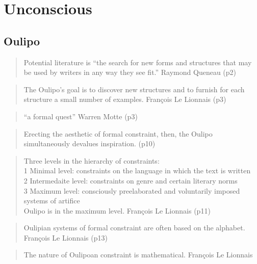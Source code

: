 \section{Unconscious}


\subsection{Oulipo}


\begin{quote}
  Potential literature is ``the search for new forms and structures that may be used by writers in any way they see fit.'' Raymond Queneau (p2)
\end{quote}

\begin{quote}
  The Oulipo's goal is to discover new structures and to furnish for each structure a small number of examples. François Le Lionnais (p3)
\end{quote}

\begin{quote}
  ``a formal quest'' Warren Motte (p3)
\end{quote}

\begin{quote}
  Erecting the aesthetic of formal constraint, then, the Oulipo simultaneously devalues inspiration. (p10)
\end{quote}

\begin{quote}
  Three levels in the hierarchy of constraints:\\1 Minimal level: constraints on the language in which the text is written\\2 Intermedaite level: constraints on genre and certain literary norms\\3 Maximum level: consciously preelaborated and voluntarily imposed systems of artifice\\Oulipo is in the maximum level. François Le Lionnais (p11)
\end{quote}

\begin{quote}
  Oulipian systems of formal constraint are often based on the alphabet. François Le Lionnais (p13)
\end{quote}

\begin{quote}
  The nature of Oulipoan constraint is mathematical. François Le Lionnais
\end{quote}

